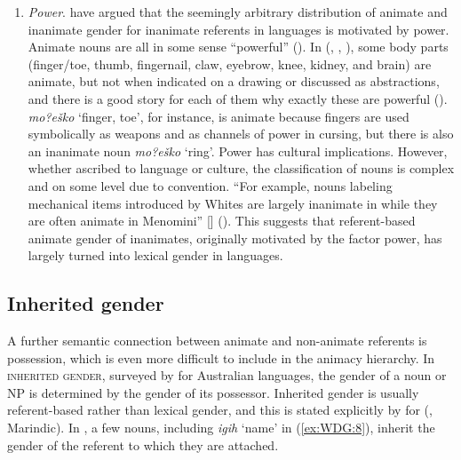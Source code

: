 \documentclass[output=collectionpaper]{langsci/langscibook}
\begin{document}
\begin{enumerate}[label=(\roman*)]
\item \textit{Power}. \cite{Straus1982} have argued that the seemingly arbitrary distribution of animate and inanimate gender for inanimate referents in  languages is motivated by power. Animate nouns are all in some sense ``powerful'' (\citealt[135]{Straus1982}). In  (, , ), some body parts (finger/toe, thumb, fingernail, claw, eyebrow, knee, kidney, and brain) are animate, but not when indicated on a drawing or discussed as abstractions, and there is a good story for each of them why exactly these are powerful (\citealt[128--130]{Straus1982}).  \textit{mo?eško} `finger, toe', for instance, is animate because fingers are used symbolically as weapons and as channels of power in cursing, but there is also an inanimate noun \textit{mo?eško} `ring'. Power has cultural implications. However, whether ascribed to language or culture, the classification of nouns is complex and on some level due to convention. ``For example, nouns labeling mechanical items introduced by Whites are largely inanimate in  while they are often animate in Menomini'' [] (\citealt[133]{Straus1982}). This suggests that referent-based animate gender of inanimates, originally motivated by the factor power, has largely turned into lexical gender in  languages.
\end{enumerate}

  \subsection{Inherited gender}
\label{sec:WDG:3.4}

A further semantic connection between animate and non-animate referents is possession, which is even more difficult to include in the animacy hierarchy. In \textsc{inherited gender}, surveyed by \cite{Evans1994} for Australian languages, the gender of a noun or NP is determined by the gender of its possessor. Inherited gender is usually referent-based rather than lexical gender, and this is stated explicitly by \cite[186]{Olsson2017} for  (, Marindic). In , a few nouns, including \textit{igih} `name' in (\ref{ex:WDG:8}), inherit the gender of the referent to which they are attached.

%
\end{document}
